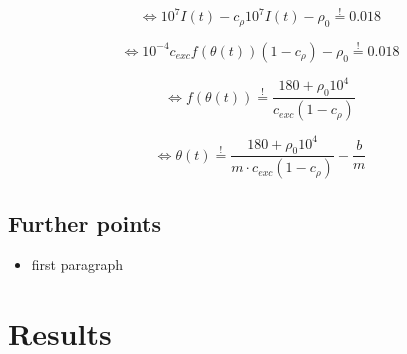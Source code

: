 \documentclass[a4paper,10pt,hidelinks]{scrreprt}
\begin{document}
	\begin{equation}
	\Leftrightarrow 10^{7} I(t) - c_{\rho} 10^{7} I(t) - \rho_{0} 
	\overset{!}{=} 0.018
	\end{equation}

	\begin{equation}
	\Leftrightarrow 10^{-4} c_{exc} f(\theta(t)) (1 - c_{\rho}) - \rho_{0} 
	\overset{!}{=} 0.018
	\end{equation}
	
	\begin{equation}
	\Leftrightarrow f(\theta(t)) \overset{!}{=} \frac{180 + \rho_{0}10^{4}} 
	{c_{exc}(1 - c_{\rho})}
	\end{equation}

	\begin{equation}
	\Leftrightarrow \theta(t) \overset{!}{=} \frac{180 + \rho_{0}10^{4}} 
	{m \cdot c_{exc}(1 - c_{\rho})} - \frac{b}{m}
	\end{equation}
	\subsection{Further points}
	\begin{itemize}
		\item first paragraph
	\end{itemize}
	\newpage
	\section{Results}
\end{document}
